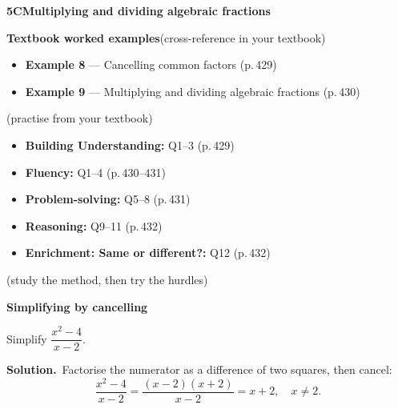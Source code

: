 \documentclass[11pt]{article}
\newcommand{\sectionband}[3]{\needspace{5\baselineskip}\vspace{6pt}
  \begin{tcolorbox}[enhanced,colback=chalk,colframe=chalk,boxrule=0pt,left=12pt,right=12pt,top=8pt,bottom=8pt,arc=4pt,
      overlay={\node[anchor=east,text=white,opacity=0.9] at ([xshift=-12pt]frame.east) {\small\textsf{#3}};}]
    {\color{white}\large\bfseries\textsf{#1}\quad #2}\end{tcolorbox}}
\begin{document}
\sectionband{5C}{Multiplying and dividing algebraic fractions}{CORE}

\begin{refbox}
{\bfseries\color{chalkdk}Textbook worked examples}\;\textcolor{inksoft}{\small(cross-reference in your textbook)}\\[3pt]
\begin{itemize}[leftmargin=16pt,itemsep=1pt,topsep=2pt]
  \item \textbf{Example 8} --- Cancelling common factors \textcolor{inksoft}{(p.\,429)}
  \item \textbf{Example 9} --- Multiplying and dividing algebraic fractions \textcolor{inksoft}{(p.\,430)}
\end{itemize}
\;\textcolor{inksoft}{\small(practise from your textbook)}\\[3pt]
\begin{itemize}[leftmargin=16pt,itemsep=1pt,topsep=2pt]
  \item \textbf{Building Understanding:} Q1--3 \textcolor{inksoft}{(p.\,429)}
  \item \textbf{Fluency:} Q1--4 \textcolor{inksoft}{(p.\,430--431)}
  \item \textbf{Problem-solving:} Q5--8 \textcolor{inksoft}{(p.\,431)}
  \item \textbf{Reasoning:} Q9--11 \textcolor{inksoft}{(p.\,432)}
  \item \textbf{Enrichment: Same or different?:} Q12 \textcolor{inksoft}{(p.\,432)}
\end{itemize}\end{refbox}

\;\textcolor{inksoft}{\small(study the method, then try the hurdles)}\par

\begin{workedbox}

{\bfseries\color{chalkdk}Simplifying by cancelling}\par\vspace{3pt}

Simplify $\dfrac{x^2-4}{x-2}$.\par\vspace{2pt}

{\bfseries Solution.}\ Factorise the numerator as a difference of two squares, then cancel: \[\frac{x^2-4}{x-2}=\frac{(x-2)(x+2)}{x-2}=x+2,\quad x\neq2.\]

\end{workedbox}
\end{document}
